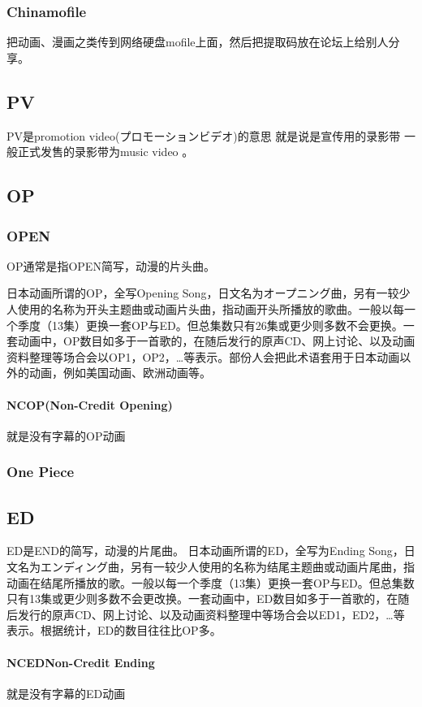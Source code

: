 \documentclass[UTF8,12pt]{ctexart}
\begin{document}
\subsubsection{Chinamofile}
把动画、漫画之类传到网络硬盘mofile上面，然后把提取码放在论坛上给别人分享。


\subsection{PV}
PV是promotion video(プロモーションビデオ)的意思 就是说是宣传用的录影带 一般正式发售的录影带为music video 。


\subsection{OP}
\subsubsection{OPEN}
OP通常是指OPEN简写，动漫的片头曲。

日本动画所谓的OP，全写Opening Song，日文名为オープニング曲，另有一较少人使用的名称为开头主题曲或动画片头曲，指动画开头所播放的歌曲。一般以每一个季度（13集）更换一套OP与ED。但总集数只有26集或更少则多数不会更换。一套动画中，OP数目如多于一首歌的，在随后发行的原声CD、网上讨论、以及动画资料整理等场合会以OP1，OP2，…等表示。部份人会把此术语套用于日本动画以外的动画，例如美国动画、欧洲动画等。
\paragraph{NCOP(Non-Credit Opening)}
就是没有字幕的OP动画

\subsubsection{One Piece}


\subsection{ED}
ED是END的简写，动漫的片尾曲。
日本动画所谓的ED，全写为Ending Song，日文名为エンディング曲，另有一较少人使用的名称为结尾主题曲或动画片尾曲，指动画在结尾所播放的歌。一般以每一个季度（13集）更换一套OP与ED。但总集数只有13集或更少则多数不会更改换。一套动画中，ED数目如多于一首歌的，在随后发行的原声CD、网上讨论、以及动画资料整理中等场合会以ED1，ED2，…等表示。根据统计，ED的数目往往比OP多。
\paragraph{NCED{Non-Credit Ending}}
就是没有字幕的ED动画
\end{document}
